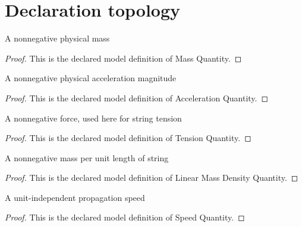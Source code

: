 \section{Declaration topology}
\begin{definition}
  \label{def:physics:phyx-mini-0241:phyxminiproblems-problemphyxmini0241-massquantity}
  A nonnegative physical mass
\end{definition}
\begin{proof}
  This is the declared model definition of Mass Quantity.
\end{proof}
\begin{definition}
  \label{def:physics:phyx-mini-0241:phyxminiproblems-problemphyxmini0241-accelerationquantity}
  A nonnegative physical acceleration magnitude
\end{definition}
\begin{proof}
  This is the declared model definition of Acceleration Quantity.
\end{proof}
\begin{definition}
  \label{def:physics:phyx-mini-0241:phyxminiproblems-problemphyxmini0241-tensionquantity}
  A nonnegative force, used here for string tension
\end{definition}
\begin{proof}
  This is the declared model definition of Tension Quantity.
\end{proof}
\begin{definition}
  \label{def:physics:phyx-mini-0241:phyxminiproblems-problemphyxmini0241-linearmassdensityquantity}
  A nonnegative mass per unit length of string
\end{definition}
\begin{proof}
  This is the declared model definition of Linear Mass Density Quantity.
\end{proof}
\begin{definition}
  \label{def:physics:phyx-mini-0241:phyxminiproblems-problemphyxmini0241-speedquantity}
  A unit-independent propagation speed
\end{definition}
\begin{proof}
  This is the declared model definition of Speed Quantity.
\end{proof}
